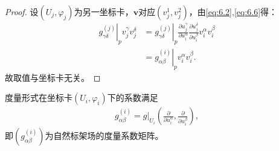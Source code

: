 \documentclass[../../main.tex]{subfiles}%
\begin{document}
\begin{proof}

设$(U_j,\varphi_j)$为另一坐标卡，$\bm{v}$对应$(v_j^1,v_j^2)$，由\eqref{eq:6.2},\eqref{eq:6.6}得：
\begin{align*}
\left.g_{\gamma\delta}^{(j)}\right|_p v_j^\gamma v_j^\delta
&=\left.g_{\gamma\delta}^{(j)}\right|_p \frac{\partial u_j^\gamma}{\partial u_i^\alpha}\frac{\partial u_j^\delta}{\partial u_i^\beta}v_i^\alpha v_i^\beta\\
&=\left.g_{\alpha\beta}^{(i)}\right|_p v_i^\alpha v_i^\beta.
\end{align*}
故取值与坐标卡无关。

\end{proof}

\begin{remark}
度量形式在坐标卡$(U_i,\varphi_i)$下的系数满足
\begin{align}
g_{\alpha\beta}^{(i)}=g|_{U_i}\left(\frac{\partial}{\partial u_i^\alpha},\frac{\partial}{\partial u_i^\beta}\right),\label{eq:6.8}
\end{align}
即$(g_{\alpha\beta}^{(i)})$为自然标架场的度量系数矩阵。
\end{remark}
\end{document}
